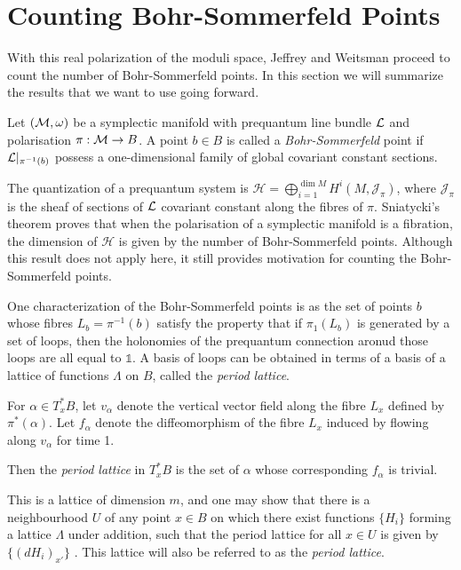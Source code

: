 	\section{Counting Bohr-Sommerfeld Points}
	With this real polarization of the moduli space, Jeffrey and Weitsman proceed to count the number of Bohr-Sommerfeld points. In this section we will summarize the results that we want to use going forward.
	
	\begin{definition}
		Let $(\mathcal{M},\omega)$ be a symplectic manifold with prequantum line bundle $\mathcal{L}$ and polarisation $\pi:\mathcal{M}\to B$. A point $b\in B$ is called a \emph{Bohr-Sommerfeld} point if $\mathcal{L}|_{\pi^{-1}(b)}$ possess a one-dimensional family of global covariant constant sections.
	\end{definition}
	The quantization of a prequantum system is $\mathcal{H} = \bigoplus_{i=1}^{\dim M} H^i(M, \mathcal{J}_\pi)$, where $\mathcal{J}_\pi$ is the sheaf of sections of $\mathcal{L}$ covariant constant along the fibres of $\pi$. Sniatycki's theorem \cite{sniatycki_cohomology_1977} proves that when the polarisation of a symplectic manifold is a fibration, the dimension of $\mathcal{H}$ is given by the number of Bohr-Sommerfeld points. Although this result does not apply here, it still provides motivation for counting the Bohr-Sommerfeld points.
	
	One characterization of the Bohr-Sommerfeld points is as the set of points $b$ whose fibres $L_b = \pi^{-1}(b)$ satisfy the property that if $\pi_1(L_b)$ is generated by a set of loops, then the holonomies of the prequantum connection aronud those loops are all equal to $\mathds{1}$. A basis of loops can be obtained in terms of a basis of a lattice of functions $\Lambda$ on $B$, called the \emph{period lattice}. 
	\begin{definition}
		For $\alpha \in T_x^\ast B$, let $v_\alpha$ denote the vertical vector field along the fibre $L_x$ defined by $\pi^\ast(\alpha)$. Let $f_\alpha$ denote the diffeomorphism of the fibre $L_x$ induced by flowing along $v_\alpha$ for time 1.
		
		Then the \emph{period lattice} in $T_x^\ast B$ is the set of $\alpha$ whose corresponding $f_\alpha$ is trivial.
	\end{definition}
	This is a lattice of dimension $m$, and one may show that there is a neighbourhood $U$ of any point $x\in B$ on which there exist functions $\{H_i\}$ forming a lattice $\Lambda$ under addition, such that the period lattice for all $x\in U$ is given by $\{(dH_i)_{x'}\}$ \cite{duistermaat_global_1980}. This lattice will also be referred to as the \emph{period lattice}.
		
